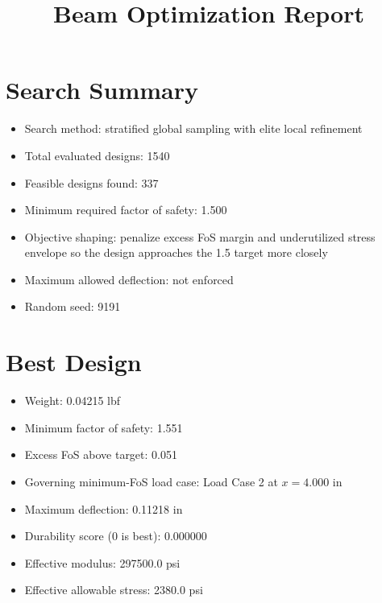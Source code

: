 \documentclass[11pt]{article}
\title{Beam Optimization Report}
\date{}
\begin{document}
\maketitle

\section*{Search Summary}
\begin{itemize}
\item Search method: stratified global sampling with elite local refinement
\item Total evaluated designs: 1540
\item Feasible designs found: 337
\item Minimum required factor of safety: 1.500
\item Objective shaping: penalize excess FoS margin and underutilized stress envelope so the design approaches the 1.5 target more closely
\item Maximum allowed deflection: not enforced
\item Random seed: 9191
\end{itemize}

\section*{Best Design}
\begin{itemize}
\item Weight: 0.04215 lbf
\item Minimum factor of safety: 1.551
\item Excess FoS above target: 0.051
\item Governing minimum-FoS load case: Load Case 2 at $x=4.000$ in
\item Maximum deflection: 0.11218 in
\item Durability score (0 is best): 0.000000
\item Effective modulus: 297500.0 psi
\item Effective allowable stress: 2380.0 psi
\end{itemize}
\end{document}
